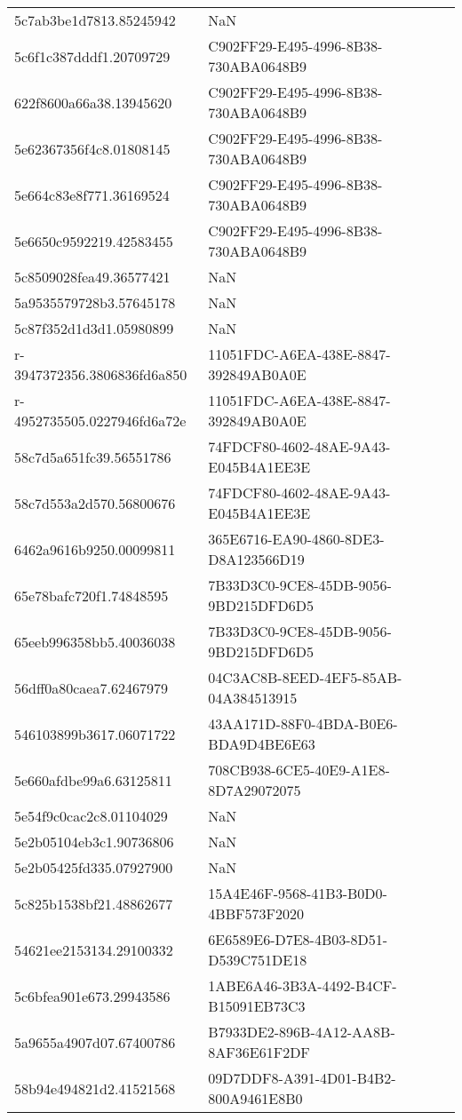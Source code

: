 \begin{tabular}{ll}
5c7ab3be1d7813.85245942 & NaN \\
5c6f1c387dddf1.20709729 & C902FF29-E495-4996-8B38-730ABA0648B9 \\
622f8600a66a38.13945620 & C902FF29-E495-4996-8B38-730ABA0648B9 \\
5e62367356f4c8.01808145 & C902FF29-E495-4996-8B38-730ABA0648B9 \\
5e664c83e8f771.36169524 & C902FF29-E495-4996-8B38-730ABA0648B9 \\
5e6650c9592219.42583455 & C902FF29-E495-4996-8B38-730ABA0648B9 \\
5c8509028fea49.36577421 & NaN \\
5a9535579728b3.57645178 & NaN \\
5c87f352d1d3d1.05980899 & NaN \\
r-3947372356.3806836fd6a850 & 11051FDC-A6EA-438E-8847-392849AB0A0E \\
r-4952735505.0227946fd6a72e & 11051FDC-A6EA-438E-8847-392849AB0A0E \\
58c7d5a651fc39.56551786 & 74FDCF80-4602-48AE-9A43-E045B4A1EE3E \\
58c7d553a2d570.56800676 & 74FDCF80-4602-48AE-9A43-E045B4A1EE3E \\
6462a9616b9250.00099811 & 365E6716-EA90-4860-8DE3-D8A123566D19 \\
65e78bafc720f1.74848595 & 7B33D3C0-9CE8-45DB-9056-9BD215DFD6D5 \\
65eeb996358bb5.40036038 & 7B33D3C0-9CE8-45DB-9056-9BD215DFD6D5 \\
56dff0a80caea7.62467979 & 04C3AC8B-8EED-4EF5-85AB-04A384513915 \\
546103899b3617.06071722 & 43AA171D-88F0-4BDA-B0E6-BDA9D4BE6E63 \\
5e660afdbe99a6.63125811 & 708CB938-6CE5-40E9-A1E8-8D7A29072075 \\
5e54f9c0cac2c8.01104029 & NaN \\
5e2b05104eb3c1.90736806 & NaN \\
5e2b05425fd335.07927900 & NaN \\
5c825b1538bf21.48862677 & 15A4E46F-9568-41B3-B0D0-4BBF573F2020 \\
54621ee2153134.29100332 & 6E6589E6-D7E8-4B03-8D51-D539C751DE18 \\
5c6bfea901e673.29943586 & 1ABE6A46-3B3A-4492-B4CF-B15091EB73C3 \\
5a9655a4907d07.67400786 & B7933DE2-896B-4A12-AA8B-8AF36E61F2DF \\
58b94e494821d2.41521568 & 09D7DDF8-A391-4D01-B4B2-800A9461E8B0 \\

\end{tabular}

